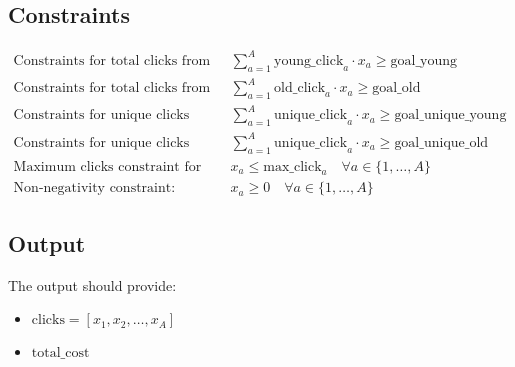 \documentclass{article}
\begin{document}
\subsection*{Constraints}
\begin{align*}
\text{Constraints for total clicks from young visitors:} \quad & \sum_{a=1}^{A} \text{young\_click}_a \cdot x_a \geq \text{goal\_young} \\
\text{Constraints for total clicks from old visitors:} \quad & \sum_{a=1}^{A} \text{old\_click}_a \cdot x_a \geq \text{goal\_old} \\
\text{Constraints for unique clicks from young visitors:} \quad & \sum_{a=1}^{A} \text{unique\_click}_a \cdot x_a \geq \text{goal\_unique\_young} \\
\text{Constraints for unique clicks from old visitors:} \quad & \sum_{a=1}^{A} \text{unique\_click}_a \cdot x_a \geq \text{goal\_unique\_old} \\
\text{Maximum clicks constraint for each ad type:} \quad & x_a \leq \text{max\_click}_a \quad \forall a \in \{1, \ldots, A\} \\
\text{Non-negativity constraint:} \quad & x_a \geq 0 \quad \forall a \in \{1, \ldots, A\}
\end{align*}

\subsection*{Output}
The output should provide:
\begin{itemize}
    \item \( \text{clicks} = [x_1, x_2, \ldots, x_A] \)
    \item \( \text{total\_cost} \)
\end{itemize}
\end{document}
